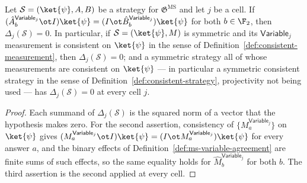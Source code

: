 \begin{lemma}\label{lem:ms-variable-agreement-zero}
	\leanok
	Let $\mathcal S = (\ket{\psi}, A, B)$ be a strategy for $\mathfrak{G}^{\mathrm{MS}}$ and let $j$ be a cell. If $(\hat A^{\mathsf{Variable}_j}_b \ot I)\ket{\psi} = (I \ot \hat B^{\mathsf{Variable}_j}_b)\ket{\psi}$ for both $b \in \F_2$, then $\Delta_j(\mathcal S) = 0$. In particular, if $\mathcal S = (\ket{\psi}, M)$ is symmetric and its $\mathsf{Variable}_j$ measurement is consistent on $\ket{\psi}$ in the sense of Definition~\ref{def:consistent-measurement}, then $\Delta_j(\mathcal S) = 0$; and a symmetric strategy all of whose measurements are consistent on $\ket{\psi}$ --- in particular a symmetric consistent strategy in the sense of Definition~\ref{def:consistent-strategy}, projectivity not being used --- has $\Delta_j(\mathcal S) = 0$ at every cell $j$.
\end{lemma}
\begin{proof}
	\leanok
	Each summand of $\Delta_j(\mathcal S)$ is the squared norm of a vector that the hypothesis makes zero. For the second assertion, consistency of $\{M^{\mathsf{Variable}_j}_a\}$ on $\ket{\psi}$ gives $(M^{\mathsf{Variable}_j}_a \ot I)\ket{\psi} = (I \ot M^{\mathsf{Variable}_j}_a)\ket{\psi}$ for every answer $a$, and the binary effects of Definition~\ref{def:ms-variable-agreement} are finite sums of such effects, so the same equality holds for $\hat M^{\mathsf{Variable}_j}_b$ for both $b$. The third assertion is the second applied at every cell.
\end{proof}


